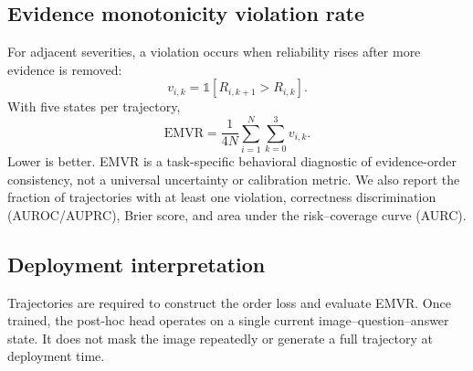 \subsection{Evidence monotonicity violation rate}

For adjacent severities, a violation occurs when reliability rises after more evidence is removed:
\begin{equation}
v_{i,k}=\mathbb{1}[R_{i,k+1}>R_{i,k}].
\end{equation}
With five states per trajectory,
\begin{equation}
\mathrm{EMVR}=\frac{1}{4N}\sum_{i=1}^N\sum_{k=0}^{3}v_{i,k}.
\label{eq:emvr}
\end{equation}
Lower is better. EMVR is a task-specific behavioral diagnostic of evidence-order consistency, not a universal uncertainty or calibration metric. We also report the fraction of trajectories with at least one violation, correctness discrimination (AUROC/AUPRC), Brier score, and area under the risk--coverage curve (AURC).

\subsection{Deployment interpretation}

Trajectories are required to construct the order loss and evaluate EMVR. Once trained, the post-hoc head operates on a single current image--question--answer state. It does not mask the image repeatedly or generate a full trajectory at deployment time.
